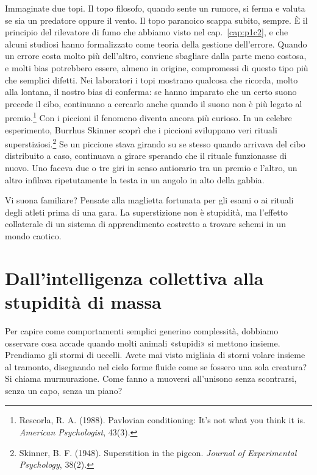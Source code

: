 Immaginate due topi. Il topo filosofo, quando sente un rumore, si ferma e valuta se sia un predatore oppure il vento. Il topo paranoico scappa subito, sempre. È il principio del rilevatore di fumo che abbiamo visto nel cap.~\ref{cap:p1c2}, e che alcuni studiosi hanno formalizzato come teoria della gestione dell'errore. Quando un errore costa molto più dell'altro, conviene sbagliare dalla parte meno costosa, e molti bias potrebbero essere, almeno in origine, compromessi di questo tipo più che semplici difetti. Nei laboratori i topi mostrano qualcosa che ricorda, molto alla lontana, il nostro bias di conferma: se hanno imparato che un certo suono precede il cibo, continuano a cercarlo anche quando il suono non è più legato al premio.\footnote{Rescorla, R. A. (1988). Pavlovian conditioning: It's not what you think it is. \textit{American Psychologist}, 43(3).} Con i piccioni il fenomeno diventa ancora più curioso. In un celebre esperimento, Burrhus Skinner scoprì che i piccioni sviluppano veri rituali superstiziosi.\footnote{Skinner, B. F. (1948). Superstition in the pigeon. \textit{Journal of Experimental Psychology}, 38(2).} Se un piccione stava girando su se stesso quando arrivava del cibo distribuito a caso, continuava a girare sperando che il rituale funzionasse di nuovo. Uno faceva due o tre giri in senso antiorario tra un premio e l'altro, un altro infilava ripetutamente la testa in un angolo in alto della gabbia.

Vi suona familiare? Pensate alla maglietta fortunata per gli esami o ai rituali degli atleti prima di una gara. La superstizione non è stupidità, ma l'effetto collaterale di un sistema di apprendimento costretto a trovare schemi in un mondo caotico.

\section{Dall'intelligenza collettiva alla stupidità di massa}

Per capire come comportamenti semplici generino complessità, dobbiamo osservare cosa accade quando molti animali «stupidi» si mettono insieme. Prendiamo gli stormi di uccelli. Avete mai visto migliaia di storni volare insieme al tramonto, disegnando nel cielo forme fluide come se fossero una sola creatura? Si chiama murmurazione. Come fanno a muoversi all'unisono senza scontrarsi, senza un capo, senza un piano?


